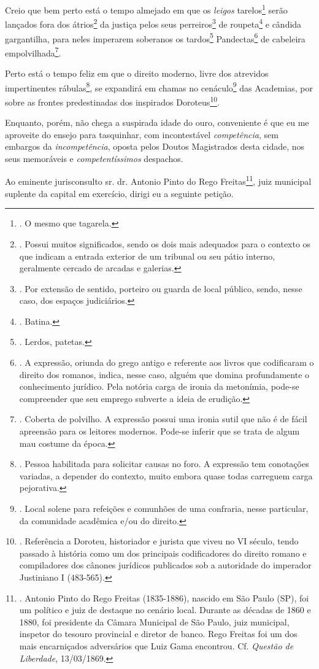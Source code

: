 Creio que bem perto está o tempo almejado em que os \emph{leigos}
tarelos\footnote{. O mesmo que tagarela.} serão lançados fora dos
átrios\footnote{. Possui muitos significados, sendo os dois mais
  adequados para o contexto os que indicam a entrada exterior de um
  tribunal ou seu pátio interno, geralmente cercado de arcadas e
  galerias.} da justiça pelos seus perreiros\footnote{. Por extensão de
  sentido, porteiro ou guarda de local público, sendo, nesse caso, dos
  espaços judiciários.} de roupeta\footnote{. Batina.} e cândida
gargantilha, para neles imperarem soberanos os tardos\footnote{. Lerdos,
  patetas.} Pandectas\footnote{. A expressão, oriunda do grego antigo e
  referente aos livros que codificaram o direito dos romanos, indica,
  nesse caso, alguém que domina profundamente o conhecimento jurídico.
  Pela notória carga de ironia da metonímia, pode-se compreender que seu
  emprego subverte a ideia de erudição.} de cabeleira
empolvilhada\footnote{. Coberta de polvilho. A expressão possui uma
  ironia sutil que não é de fácil apreensão para os leitores modernos.
  Pode-se inferir que se trata de algum mau costume da época.}.

Perto está o tempo feliz em que o direito moderno, livre dos atrevidos
impertinentes rábulas\footnote{. Pessoa habilitada para solicitar causas
  no foro. A expressão tem conotações variadas, a depender do contexto,
  muito embora quase todas carreguem carga pejorativa.}, se expandirá em
chamas no cenáculo\footnote{. Local solene para refeições e comunhões de
  uma confraria, nesse particular, da comunidade acadêmica e/ou do
  direito.} das Academias, por sobre as frontes predestinadas dos
inspirados Doroteus\footnote{. Referência a Doroteu, historiador e
  jurista que viveu no VI século, tendo passado à história como um dos
  principais codificadores do direito romano e compiladores dos cânones
  jurídicos publicados sob a autoridade do imperador Justiniano I
  (483-565).}.

Enquanto, porém, não chega a suspirada idade do ouro, conveniente é que
eu me aproveite do ensejo para tasquinhar, com incontestável
\emph{competência}, sem embargos da \emph{incompetência}, oposta pelos
Doutos Magistrados desta cidade, nos seus memoráveis e
\emph{competentíssimos} despachos.

Ao eminente jurisconsulto sr. dr. Antonio Pinto do Rego
Freitas\footnote{. Antonio Pinto do Rego Freitas (1835-1886), nascido em
  São Paulo (SP), foi um político e juiz de destaque no cenário local.
  Durante as décadas de 1860 e 1880, foi presidente da Câmara Municipal
  de São Paulo, juiz municipal, inspetor do tesouro provincial e diretor
  de banco. Rego Freitas foi um dos mais encarniçados adversários que
  Luiz Gama encontrou. Cf. \emph{Questão de Liberdade}, 13/03/1869.},
juiz municipal suplente da capital em exercício, dirigi eu a seguinte
petição.

